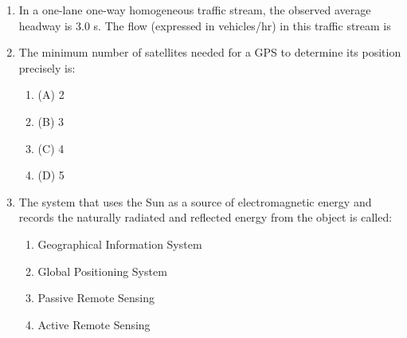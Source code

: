 \documentclass[journal]{IEEEtran}
\begin{document}
\begin{enumerate}
   
      \begin{figure}[H]
        \centering
    \end{figure}
       

    
    
    
    The theoretically plausible correct graphs according to the 'Marshall mixture design output' are:
    \begin{multicols}{4}
        
        \begin{enumerate}
            \item  P, Q, R
            \item  P, Q, S
            \item  Q, R, S
            \item  R, S, P
        \end{enumerate}
            \end{multicols}


    \item In a one-lane one-way homogeneous traffic stream, the observed average headway is 3.0 s. The flow (expressed in vehicles/hr) in this traffic stream is \underline{\hspace{1cm}}
        

    \item The minimum number of satellites needed for a GPS to determine its position precisely is:
    \begin{multicols}{4}
        
        \begin{enumerate}
            \item (A) 2
            \item (B) 3
            \item (C) 4
            \item (D) 5
        \end{enumerate}
            \end{multicols}


    \item The system that uses the Sun as a source of electromagnetic energy and records the naturally radiated and reflected energy from the object is called:
        \begin{enumerate}
            \item  Geographical Information System
            \item  Global Positioning System
            \item  Passive Remote Sensing
            \item  Active Remote Sensing
        \end{enumerate}


\end{enumerate}
\end{document}
